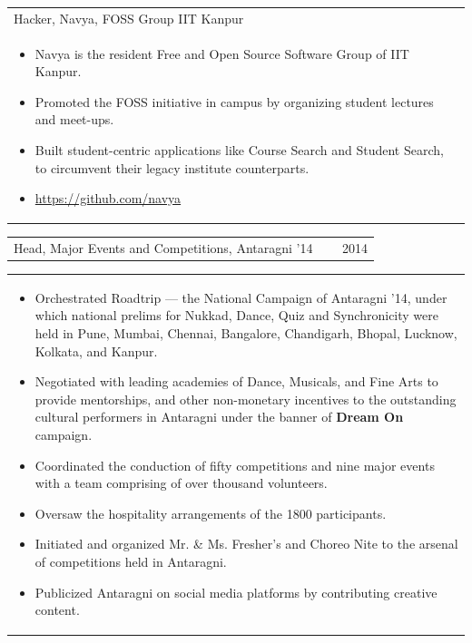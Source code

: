 \documentclass[a4paper,10pt]{article} %
\newcommand{\iproject}[3]{
    \begin{tabular}{p{0.85\linewidth}r}
        \textcolor{NavyBlue}{#2} & \multicolumn{1}{m{3cm}}{\raggedleft \textsc{#1}}\\
    \end{tabular}
    \begin{tabular}{p{\linewidth}}
    \vspace{-0.3cm}
        \footnotesize{#3}
    \end{tabular}
    \vspace{-0.5cm}
}
\newcommand{\projectlist}[2]{
    \begin{tabular}{p{\linewidth}}
        \textcolor{NavyBlue}{#1}\\
        \vspace{-0.3cm}
        \footnotesize{#2}
    \end{tabular}
    \vspace{-0.4cm}
}
\begin{document}
\projectlist {Hacker, Navya, FOSS Group IIT Kanpur}
             {
                   \begin{itemize}[leftmargin=0.5cm]
                       \item Navya is the resident Free and Open Source Software Group of IIT Kanpur.
                       \item Promoted the FOSS initiative in campus by organizing student lectures and meet-ups.
                       \item Built student-centric applications like Course Search and Student Search, to circumvent
                           their legacy institute counterparts.
                       \item \href{https://github.com/navya} {https://github.com/navya}
                   \end{itemize}
             }

\iproject {2014}
          {Head, Major Events and Competitions, Antaragni '14}
          {
               \begin{itemize}[leftmargin=0.5cm]
                    \item Orchestrated Roadtrip --- the National Campaign of Antaragni '14, under which national prelims for Nukkad,
                        Dance, Quiz and Synchronicity were held in Pune, Mumbai, Chennai, Bangalore, Chandigarh, Bhopal, Lucknow,
                        Kolkata, and Kanpur.
                    \item Negotiated with leading academies of Dance, Musicals, and Fine Arts to provide mentorships, and other
                        non-monetary incentives to the outstanding cultural performers in Antaragni under the banner
                        of \textbf{Dream On} campaign.
                    \item Coordinated the conduction of fifty competitions and nine major events with a team comprising of over
                        thousand volunteers.
                    \item Oversaw the hospitality arrangements of the 1800 participants.
                    \item Initiated and organized Mr. \& Ms. Fresher's and Choreo Nite to the arsenal of competitions
                        held in Antaragni.
                    \item Publicized Antaragni on social media platforms by contributing creative content.
               \end{itemize}
          }
\end{document}
